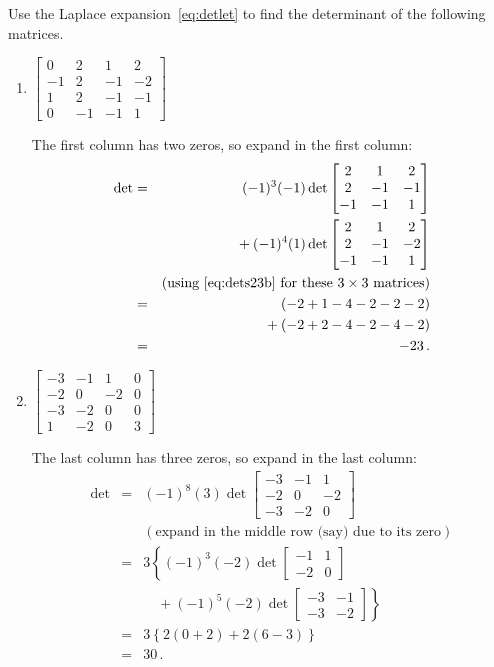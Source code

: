 \begin{example} \label{eg:}
Use the Laplace expansion~\eqref{eq:detlet} to find the determinant of the following matrices.
\begin{enumerate}
\item \(\begin{bmatrix}0&2&1&2
\\-1&2&-1&-2
\\1&2&-1&-1
\\0&-1&-1&1 \end{bmatrix}\)
\begin{solution} 
The first column has two zeros, so expand in the first column:
\begin{eqnarray*}
\det&=&(-1)^3(-1)\det\begin{bmatrix}2&1&2
\\2&-1&-1
\\-1&-1&1 \end{bmatrix}
\\&&{}
+(-1)^4(1)\det\begin{bmatrix}2&1&2
\\2&-1&-2
\\-1&-1&1 \end{bmatrix}
\\&&(\text{using~\eqref{eq:dets23b} for these \(3\times3\) matrices})
\\&=&(-2+1-4-2-2-2)
\\&&{}
+(-2+2-4-2-4-2)
\\&=&-23\,.
\end{eqnarray*}
\end{solution}

\item \(\begin{bmatrix}-3&-1&1&0
\\-2&0&-2&0
\\-3&-2&0&0
\\1&-2&0&3 \end{bmatrix}\)
\begin{solution} 
The last column has three zeros, so expand in the last column:
\begin{eqnarray*}
\det&=&(-1)^8(3)\det\begin{bmatrix}-3&-1&1
\\-2&0&-2
\\-3&-2&0 \end{bmatrix}
\\&&(\text{expand in the middle row (say) due to its zero})
\\&=&3\left\{ (-1)^3(-2)\det\begin{bmatrix} -1&1\\-2&0 \end{bmatrix}
\right.\\&&\left.\quad{}
+(-1)^5(-2)\det\begin{bmatrix} -3&-1\\-3&-2 \end{bmatrix} \right\}
\\&=&3\left\{2(0+2)+2(6-3)\right\}
\\&=&30\,.
\end{eqnarray*}
\end{solution}



\end{enumerate}
\end{example}
